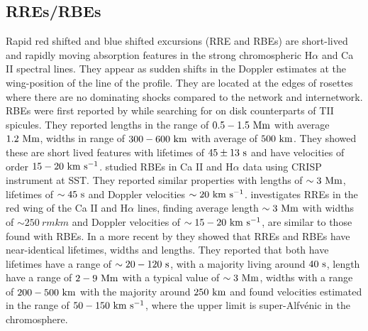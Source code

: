\documentclass[12pt]{ociamthesis}
\newcommand{\Alfvenic}{Alfv\'{e}nic }
\newcommand{\kms}{~\rm{km ~s^{-1}}}
\newcommand{\np}{\\ \\}
\begin{document}
\subsection{RREs/RBEs}
\label{subsec:rbe}
Rapid red shifted and blue shifted excursions (RRE and RBEs) are short-lived and rapidly moving absorption features in the strong chromospheric H$\alpha$ and Ca II spectral lines. They appear as sudden shifts in the Doppler estimates at the wing-position of the line of the profile. They are located at the edges of rosettes where there are no dominating shocks compared to the network and internetwork. RBEs were first reported by \cite{Langangen2008ApJ} while searching for on disk counterparts of TII spicules. They reported lengths in the range of $0.5-1.5~\rm{Mm}$ with average $1.2~\rm{Mm}$, widths in range of $300-600~\rm{km}$ with average of $500~\rm{km}$. They showed these are short lived features with lifetimes of $45\pm13~\rm{s}$ and have velocities of order $15-20\kms$.\cite{Rouppe2009ApJ} studied RBEs in Ca II and H$\alpha$ data using CRISP instrument at SST. They reported similar properties with lengths of $\sim 3~\rm{Mm}$, lifetimes of $\sim 45~\rm{s}$ and Doppler velocities $\sim 20\kms$. \cite{Sekse2013ApJ76944S,Sekse2013ApJ764164S} investigates RREs in the red wing of the  Ca II and H$\alpha$ lines, finding average length $\sim 3~\rm{Mm}$ with widths of $\sim 250~rm{km}$ and Doppler velocities of $\sim 15-20\kms$, are similar to those found with RBEs.  In a more recent by \cite{Kuridze2015ApJ80226K} they showed that RREs and RBEs have near-identical lifetimes, widths and lengths. They reported that both have lifetimes have a range of $\sim 20-120~\rm{s}$, with a majority living around $40~\rm{s}$, length have a range of $2-9~\rm{Mm}$ with a typical value of $\sim 3~\rm{Mm}$, widths with a range of $200-500~\rm{km}$ with the majority around $250~\rm{km}$ and found velocities estimated in the range of $50-150\kms$, where the upper limit is super-\Alfvenic in the chromosphere. \np
%
\end{document}
